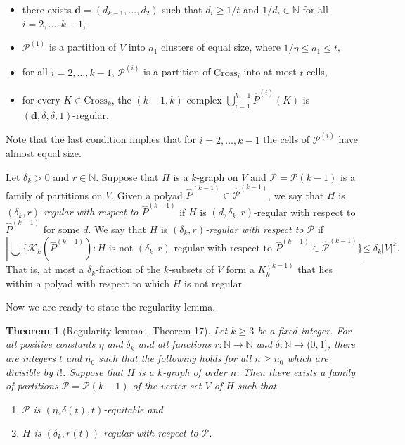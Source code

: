 \documentclass[11pt, reqno]{amsart}    	%
\newtheorem{thm}{Theorem}[section]
\theoremstyle{definition}
\numberwithin{equation}{section}
\begin{document}
	\begin{itemize}
		\item there exists $\mathbf{d}= (d_{k-1}, \dots , d_2)$ such that $d_i \geq 1/t$ and $1/d_i \in \mathbb{N}$ for all $i = 2, \dots , k-1$,
		\item $\mathcal{P}^{(1)}$ is a partition of $V$ into $a_1$ clusters of equal size, where $1/\eta \leq a_1 \leq t$,
		\item for all $i = 2, \dots , k-1$, $\mathcal{P}^{(i)}$ is a partition of $\mathrm{Cross}_i$ into at most $t$ cells,
		\item for every $K \in \mathrm{Cross}_k$, the $(k-1, k)$-complex $\bigcup^{k-1}_{i=1}\hat{P}^{(i)}(K)$ is $(\mathbf{d}, \delta, \delta, 1)$-regular.
	\end{itemize}
	\vspace{3mm}
	Note that the last condition implies that for $i = 2, \dots , k-1$ the cells of $\mathcal{P}^{(i)}$ have almost equal size.
	
	Let $\delta_k > 0$ and $r \in \mathbb{N}$. Suppose that $H$ is a $k$-graph on $V$ and $\mathcal{P} = \mathcal{P}(k-1)$ is a family of partitions on $V$. Given a polyad $\hat{P}^{(k-1)} \in \hat{\mathcal{P}}^{(k-1)}$, we say that $H$ is \emph{$(\delta_k, r)$-regular with respect to $\hat{P}^{(k-1)}$} if $H$ is $(d, \delta_k, r)$-regular with respect to $\hat{P}^{(k-1)}$ for some $d$. We say that $H$ is \emph{$(\delta_k, r)$-regular with respect to $\mathcal{P}$} if
	\[
	\left|\bigcup\{\mathcal{K}_k(\hat{P}^{(k-1)}): \text{$H$ is not $(\delta_k, r)$-regular with respect} \text{ to } \hat{P}^{(k-1)} \in \hat{\mathcal{P}}^{(k-1)} \}\right| \leq \delta_k|V|^k.\]
	That is, at most a $\delta_k$-fraction of the $k$-subsets of $V$ form a $K_k^{(k-1)}$ that lies within a polyad with respect to which $H$ is not regular.
	
	Now we are ready to state the regularity lemma.
	
	\begin{thm}[Regularity lemma \cite{R2007Regular}, Theorem 17] 
		\label{reglm}
		Let $k\geq 3$ be a fixed integer. For all positive constants $\eta$ and $\delta_k$ and all functions $r:\mathbb{N} \rightarrow \mathbb{N}$ and $\delta:\mathbb{N} \rightarrow (0,1]$, there are integers $t$ and $n_0$ such that the following holds for all $n \geq n_0$ which are divisible by $t!$. Suppose that $H$ is a $k$-graph of order $n$. Then there exists a family of partitions $\mathcal{P}= \mathcal{P}(k-1)$ of the vertex set $V$ of $H$ such that
		\begin{enumerate}
			\item $\mathcal{P}$ is $(\eta, \delta(t), t)$-equitable and
			\item $H$ is $(\delta_k, r(t))$-regular with respect to $\mathcal{P}$.
		\end{enumerate}
	\end{thm}
	
\end{document}
